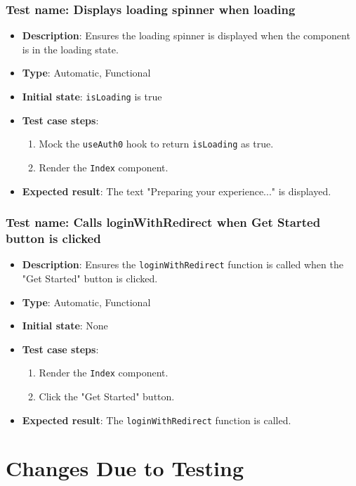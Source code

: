 \documentclass[12pt, titlepage]{article}
\begin{document}
\subsubsection{Test name: Displays loading spinner when loading}
\begin{itemize}
    \item \textbf{Description}: Ensures the loading spinner is displayed when the component is in the loading state.
    \item \textbf{Type}: Automatic, Functional
    \item \textbf{Initial state}: \texttt{isLoading} is true
    \item \textbf{Test case steps}:
    \begin{enumerate}
        \item Mock the \texttt{useAuth0} hook to return \texttt{isLoading} as true.
        \item Render the \texttt{Index} component.
    \end{enumerate}
    \item \textbf{Expected result}: The text "Preparing your experience..." is displayed.
\end{itemize}

\subsubsection{Test name: Calls loginWithRedirect when Get Started button is clicked}
\begin{itemize}
    \item \textbf{Description}: Ensures the \texttt{loginWithRedirect} function is called when the "Get Started" button is clicked.
    \item \textbf{Type}: Automatic, Functional
    \item \textbf{Initial state}: None
    \item \textbf{Test case steps}:
    \begin{enumerate}
        \item Render the \texttt{Index} component.
        \item Click the "Get Started" button.
    \end{enumerate}
    \item \textbf{Expected result}: The \texttt{loginWithRedirect} function is called.
\end{itemize}

\section{Changes Due to Testing}
\end{document}
